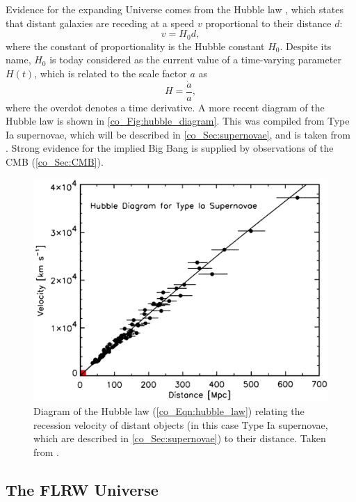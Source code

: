 Evidence for the expanding Universe comes from the Hubble law \citep{Lemaitre1927, Hubble1929}, which states that distant galaxies are receding at a speed $v$ proportional to their distance $d$:
\begin{equation}
v = H_0 d,
\label{co_Eqn:hubble_law}
\end{equation}
where the constant of proportionality is the Hubble constant $H_0$. Despite its name, $H_0$ is today considered as the current value of a time-varying parameter $H \left( t \right)$, which is related to the scale factor $a$ as
\begin{equation}
H = \frac{\dot{a}}{a},
\label{co_Eq:hubble_param}
\end{equation}
where the overdot denotes a time derivative. A more recent diagram of the Hubble law is shown in \autoref{co_Fig:hubble_diagram}. This was compiled from Type Ia supernovae, which will be described in \autoref{co_Sec:supernovae}, and is taken from \citet{Kirshner2004}. Strong evidence for the implied Big Bang is supplied by observations of the CMB (\autoref{co_Sec:CMB}).

\begin{figure}
\centering
\includegraphics[width=.8\textwidth]{hubble_diagram}
\caption{Diagram of the Hubble law (\autoref{co_Eqn:hubble_law}) relating the recession velocity of distant objects (in this case Type Ia supernovae, which are described in \autoref{co_Sec:supernovae}) to their distance. Taken from \citet{Kirshner2004}.}
\label{co_Fig:hubble_diagram}
\end{figure}

\subsection{The FLRW Universe}

